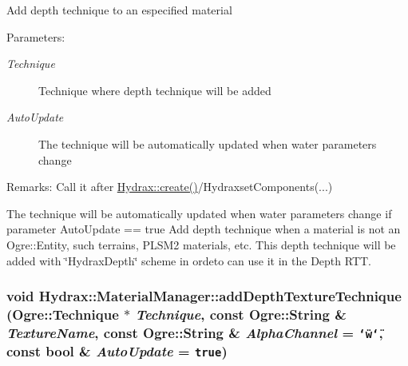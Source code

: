 \begin{CompactItemize}
Add depth technique to an especified material \begin{Desc}
\item[Parameters:]
\begin{description}
\item[{\em Technique}]Technique where depth technique will be added \item[{\em AutoUpdate}]The technique will be automatically updated when water parameters change \end{description}
\end{Desc}
\begin{Desc}
\item[Remarks:]Call it after \hyperlink{class_hydrax_1_1_hydrax_af840e19208614533a6b344e32965ee2}{Hydrax::create()}/HydraxsetComponents(...)\end{Desc}
The technique will be automatically updated when water parameters change if parameter AutoUpdate == true Add depth technique when a material is not an Ogre::Entity, such terrains, PLSM2 materials, etc. This depth technique will be added with \char`\"{}HydraxDepth\char`\"{} scheme in ordeto can use it in the Depth RTT. \hypertarget{class_hydrax_1_1_material_manager_0ee548c5ba041a7e26a1561dbac28ae4}{
\subsubsection[{addDepthTextureTechnique}]{\setlength{\rightskip}{0pt plus 5cm}void Hydrax::MaterialManager::addDepthTextureTechnique (Ogre::Technique $\ast$ {\em Technique}, \/  const Ogre::String \& {\em TextureName}, \/  const Ogre::String \& {\em AlphaChannel} = {\tt \char`\"{}w\char`\"{}}, \/  const bool \& {\em AutoUpdate} = {\tt true})}}
\label{class_hydrax_1_1_material_manager_0ee548c5ba041a7e26a1561dbac28ae4}



\end{CompactItemize}
